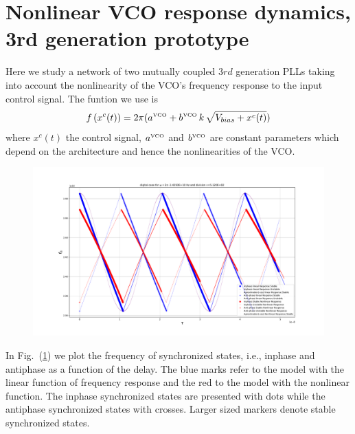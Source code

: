 \documentclass{article}
\begin{document}
\justify
\section{Nonlinear VCO response dynamics, 3rd generation prototype}

Here we study a network of two mutually coupled $3rd$ generation PLLs taking into account the nonlinearity of the VCO's frequency response to the input control signal. 
%
The funtion we use is
%
\begin{equation} \label{N_delay_coupled}
	f\left( x^c(t) \right)=2\pi(a^\textrm{\tiny VCO}+b^\textrm{\tiny VCO}\,k\,\sqrt{V_{bias}+ x^c(t) } )
\end{equation}
where $x^c(t)$ the control signal, $a^\textrm{\tiny VCO}$ and $b^\textrm{\tiny VCO}$ are constant parameters which depend on the architecture and hence the nonlinearities of the VCO.
%

\begin{figure}[!h]
	\centering
	\includegraphics[width=17cm]{Omega_tau_3rdGen_linear_vs_Nonlinear_Freq_Response_pic1.pdf}	
	\caption{ }
	\label{fig:1}


\end{figure}

 In Fig.~(\ref{fig:1}) we plot the frequency of synchronized states, i.e., inphase and antiphase as a function of the delay. 
 The blue marks refer to the model with the linear function of frequency response and the red to the model with the nonlinear function. 
 The inphase synchronized states are presented with dots while the antiphase synchronized states with crosses. 
 Larger sized markers denote stable synchronized states.
\end{document}
